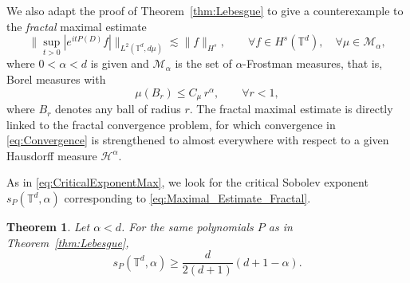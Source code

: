 \documentclass[11pt,reqno]{amsart}
\newtheorem{thm}{Theorem}[section]
\theoremstyle{definition}
\numberwithin{equation}{section}
\theoremstyle{remark}
\begin{document}
We also adapt the proof of Theorem~\ref{thm:Lebesgue} 
to give a counterexample to the \textit{fractal} maximal estimate
\begin{equation}\label{eq:Maximal_Estimate_Fractal}
\big\lVert   \sup_{t > 0} |e^{itP(D)}f| \big\rVert_{L^2(\mathbb T^d, d\mu)} \lesssim \lVert f \rVert_{H^s}, \qquad \forall f \in H^s(\mathbb T^d), 
\quad \forall \mu \in \mathcal M_\alpha, 
\end{equation}
where $0 < \alpha < d$ is given and $\mathcal M_\alpha$ is the set of $\alpha$-Frostman measures, 
that is, Borel measures with 
\begin{equation}
    \mu(B_r) \leq C_\mu\, r^\alpha, \qquad \forall r < 1, 
\end{equation}
where $B_r$ denotes any ball of radius $r$. 
The fractal maximal estimate is directly linked to the fractal convergence problem, for which convergence in \eqref{eq:Convergence} is strengthened to almost everywhere with respect to a given Hausdorff measure $\mathcal H^\alpha$.

As in \eqref{eq:CriticalExponentMax}, 
we look for the critical Sobolev exponent $s_P(\mathbb T^d, \alpha)$ corresponding to \eqref{eq:Maximal_Estimate_Fractal}.

%
%

\begin{thm}\label{thm:Fractal}
Let $\alpha < d$. 
For the same polynomials $P$ as in Theorem~\ref{thm:Lebesgue}, 
\begin{equation}
    s_P(\mathbb T^d, \alpha) \geq \frac{d}{2(d+1)}(d+1-\alpha). 
\end{equation}
%
\end{thm}
\end{document}
